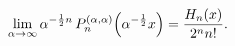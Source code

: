 \[\lim_{\alpha\to\infty}\alpha^{-\frac{1}{2}n}\mathop{P^{(\alpha,\alpha)}_{n}\/}%
\nolimits\!\left(\alpha^{-\frac{1}{2}}x\right)=\frac{\mathop{H_{n}\/}\nolimits%
\!\left(x\right)}{2^{n}n!}.\]